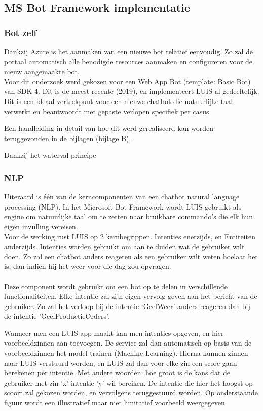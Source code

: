 \subsection{MS Bot Framework implementatie}
\subsubsection{Bot zelf}
Dankzij Azure is het aanmaken van een nieuwe bot relatief eenvoudig. Zo zal de portaal automatisch alle benodigde resources aanmaken en configureren voor de nieuw aangemaakte bot.\\

Voor dit onderzoek werd gekozen voor een Web App Bot (template: Basic Bot) van SDK 4. Dit is de meest recente (2019), en implementeert LUIS al gedeeltelijk. Dit is een ideaal vertrekpunt voor een nieuwe chatbot die natuurlijke taal verwerkt en beantwoordt met gepaste verlopen specifiek per casus. 

Een handleiding in detail van hoe dit werd gerealiseerd kan worden teruggevonden in de bijlagen (bijlage B).

Dankzij het waterval-principe 

\subsubsection{NLP}
Uiteraard is één van de kerncomponenten van een chatbot natural language processing (NLP). In het Microsoft Bot Framework wordt LUIS gebruikt als engine om natuurlijke taal om te zetten naar bruikbare commando's die elk hun eigen invulling vereisen.\\ 

Voor de werking rust LUIS op 2 kernbegrippen. Intenties enerzijds, en Entiteiten anderzijds. Intenties worden gebruikt om aan te duiden wat de gebruiker wilt doen. Zo zal een chatbot anders reageren als een gebruiker wilt weten hoelaat het is, dan indien hij het weer voor die dag zou opvragen.\\
\\
Deze component wordt gebruikt om een bot op te delen in verschillende functionaliteiten. Elke intentie zal zijn eigen vervolg geven aan het bericht van de gebruiker. Zo zal het verloop bij de intentie `GeefWeer' anders reageren dan bij de intentie 'GeefProductieOrders'. 

Wanneer men een LUIS app maakt kan men intenties opgeven, en hier voorbeeldzinnen aan toevoegen. De service zal dan automatisch op basis van de voorbeeldzinnen het model trainen (Machine Learning). Hierna kunnen zinnen naar LUIS verstuurd worden, en LUIS zal dan voor elke zin een score gaan berekenen per intentie. Met andere woorden: hoe groot is de kans dat de gebruiker met zin 'x' intentie 'y' wil bereiken. De intentie die hier het hoogst op scoort zal gekozen worden, en vervolgens teruggestuurd worden. 
Op onderstaande figuur wordt een illustratief maar niet limitatief voorbeeld weergegeven. 

